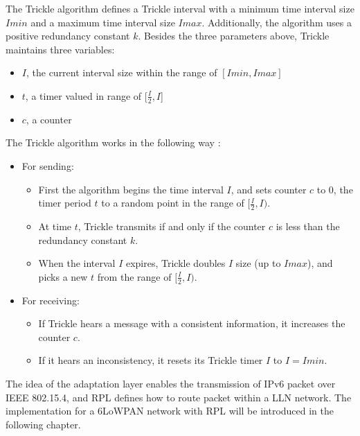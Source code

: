 The Trickle algorithm defines a Trickle interval with a minimum time interval size $Imin$ and a maximum time interval size $Imax$. Additionally, the algorithm uses a positive redundancy constant $k$. Besides the three parameters above, Trickle maintains three variables:
\begin{itemize}
 \item $I$, the current interval size within the range of $[Imin, Imax]$
 
 \item $t$, a timer valued in range of [$\frac{I}{2}, I$]
 
 \item $c$, a counter
\end{itemize}

The Trickle algorithm works in the following way \cite{RFC 6206}:
\begin{itemize}
\item For sending:
  \begin{itemize}
  \item First the algorithm begins the time interval $I$, and sets counter $c$ to 0, the timer period $t$ to a random point in the range of $[\frac{I}{2}, I)$.
  
  \item At time $t$, Trickle transmits if and only if the counter $c$ is less than the redundancy constant $k$.
  
  \item When the interval $I$ expires, Trickle doubles $I$ size (up to $Imax$), and picks a new $t$ from the range of $[\frac{I}{2}, I)$. 
  \end{itemize}  
  
\item For receiving:
 \begin{itemize}
 \item If Trickle hears a message with a consistent information, it increases the counter $c$.
 
 \item If it hears an inconsistency, it resets its Trickle timer $I$ to $I=Imin$.
 \end{itemize}
\end{itemize}


The idea of the adaptation layer enables the transmission of IPv6 packet over IEEE 802.15.4, and RPL defines how to route packet within a LLN network. The implementation for a 6LoWPAN network with RPL will be introduced in the following chapter.






